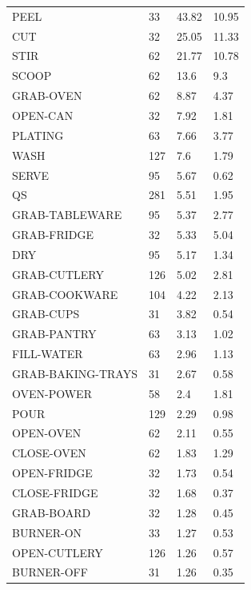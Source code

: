 {\begin{xltabular}{\textwidth}{X X X X}
PEEL                 & 33    & 43.82  & 10.95  \\
CUT                  & 32    & 25.05  & 11.33  \\
STIR                 & 62    & 21.77  & 10.78  \\
SCOOP                & 62    & 13.6   & 9.3    \\
GRAB-OVEN            & 62    & 8.87   & 4.37   \\
OPEN-CAN             & 32    & 7.92   & 1.81   \\
PLATING              & 63    & 7.66   & 3.77   \\
WASH                 & 127   & 7.6    & 1.79   \\
SERVE                & 95    & 5.67   & 0.62   \\
QS                   & 281   & 5.51   & 1.95   \\
GRAB-TABLEWARE       & 95    & 5.37   & 2.77   \\
GRAB-FRIDGE          & 32    & 5.33   & 5.04   \\
DRY                  & 95    & 5.17   & 1.34   \\
GRAB-CUTLERY         & 126   & 5.02   & 2.81   \\
GRAB-COOKWARE        & 104   & 4.22   & 2.13   \\
GRAB-CUPS            & 31    & 3.82   & 0.54   \\
GRAB-PANTRY          & 63    & 3.13   & 1.02   \\
FILL-WATER           & 63    & 2.96   & 1.13   \\
GRAB-BAKING-TRAYS    & 31    & 2.67   & 0.58   \\
OVEN-POWER           & 58    & 2.4    & 1.81   \\
POUR                 & 129   & 2.29   & 0.98   \\
OPEN-OVEN            & 62    & 2.11   & 0.55   \\
CLOSE-OVEN           & 62    & 1.83   & 1.29   \\
OPEN-FRIDGE          & 32    & 1.73   & 0.54   \\
CLOSE-FRIDGE         & 32    & 1.68   & 0.37   \\
GRAB-BOARD           & 32    & 1.28   & 0.45   \\
BURNER-ON            & 33    & 1.27   & 0.53   \\
OPEN-CUTLERY         & 126   & 1.26   & 0.57   \\
BURNER-OFF           & 31    & 1.26   & 0.35   \\

\end{xltabular}}
